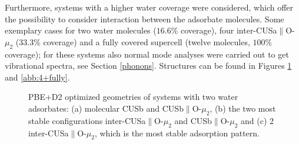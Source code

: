 \documentclass[11pt,DIV=13,BCOR=5mm,a4paper,headinclude]{scrbook}
\begin{document}
Furthermore, systems with a higher water coverage were considered, which offer the possibility to consider interaction between the adsorbate molecules. Some exemplary cases for two water molecules ($16.6\%$ coverage), four inter-CUSa$\parallel$O-$\mu_2$ ($33.3\%$ coverage) and a fully covered supercell (twelve molecules, $100\%$ coverage); for these systems also normal mode analyses were carried out to get vibrational spectra, see Section \ref{phonons}.
Structures can be found in Figures \ref{abb:2water} and \ref{abb:4+fully}.
\begin{figure}[!ht]
 \centering
{}
 \quad\quad
  \quad
{}
 \quad
 \caption{PBE+D2 optimized geometries of systems with two water adsorbates: (a) molecular CUSb and CUSb$\parallel$O-$\mu_2$, (b) the two most stable configurations inter-CUSa$\parallel$O-$\mu_2$ and CUSb$\parallel$O-$\mu_2$ and (c) 2 inter-CUSa$\parallel$O-$\mu_2$, which is the most stable adsorption pattern.}
        \label{abb:2water}
 \end{figure}
\end{document}
